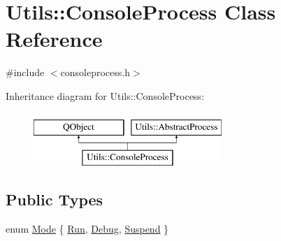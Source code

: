 \hypertarget{class_utils_1_1_console_process}{\section{Utils\-:\-:Console\-Process Class Reference}
\label{class_utils_1_1_console_process}
}


{\ttfamily \#include $<$consoleprocess.\-h$>$}

Inheritance diagram for Utils\-:\-:Console\-Process\-:\begin{figure}[H]
\begin{center}
\leavevmode
\includegraphics[height=2.000000cm]{class_utils_1_1_console_process}
\end{center}
\end{figure}
\subsection*{Public Types}
\begin{DoxyCompactItemize}
\item 
enum \hyperlink{class_utils_1_1_console_process_a6c86a313e133158cd77772a207426e41}{Mode} \{ \hyperlink{class_utils_1_1_console_process_a6c86a313e133158cd77772a207426e41a14b3f49a287137fd8ef08013e02fc674}{Run}, 
\hyperlink{class_utils_1_1_console_process_a6c86a313e133158cd77772a207426e41a231b80c70550ea74c6c61d7fe701db68}{Debug}, 
\hyperlink{class_utils_1_1_console_process_a6c86a313e133158cd77772a207426e41a41487da85390b78d6a83eb3ddd0d0625}{Suspend}
 \}
\end{DoxyCompactItemize}
